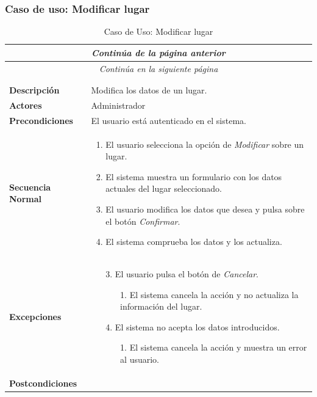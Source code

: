 \subsubsection*{Caso de uso: Modificar lugar }
\begin{longtable}{| p{4cm} | p{10cm} |}
\endfirsthead
\multicolumn{2}{c}{\textit{Continúa de la página anterior}}\\[12pt]
\hline
\endhead
\hline
\multicolumn{2}{c}{\textit{Continúa en la siguiente página}} \\
\endfoot
\hline
\caption{Caso de Uso: Modificar lugar}\label{fig:1}\\
\endlastfoot


\hline
\multicolumn{2}{|c|}{\textbf{CU$<$35$>$ - Modificar Lugar}} \\

\hline
\textbf{Descripción} &
Modifica los datos de un lugar.\\

\hline
\textbf{Actores} &
Administrador\\

\hline
\textbf{Precondiciones} &
El usuario está autenticado en el sistema.\\

\hline
\textbf{Secuencia Normal} &\mbox{}\par\vspace{-\baselineskip}
\begin{enumerate}[leftmargin=0.7cm, topsep=0.1cm]
\item El usuario selecciona la opción de \textit{Modificar} sobre un lugar.
\item El sistema muestra un formulario con los datos actuales del lugar seleccionado.
\item El usuario modifica los datos que desea y pulsa sobre el botón \textit{Confirmar}.
\item El sistema comprueba los datos y los actualiza.
\end{enumerate}


\\
\hline
\textbf{Excepciones} &\mbox{}\par\vspace{-\baselineskip}
\begin{enumerate}[leftmargin=0.9cm, topsep=0.1cm]
\item[3.] El usuario pulsa el botón de \textit{Cancelar}.
	\begin{itemize}
	\item[1.] El sistema cancela la acción y no actualiza la información del lugar.
	\end{itemize}
\item[4.] El sistema no acepta los datos introducidos.
	\begin{itemize}
	\item[1.] El sistema cancela la acción y muestra un error al usuario.
	\end{itemize}
\end{enumerate}
\\

\hline
\textbf{Postcondiciones} & \\
\hline
\end{longtable}



